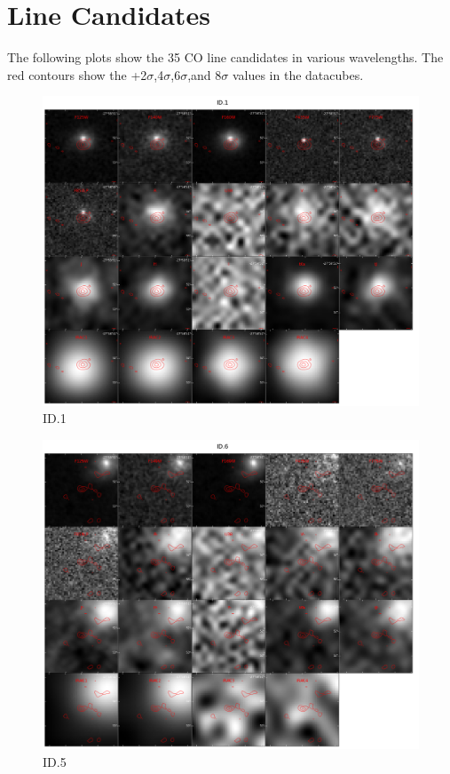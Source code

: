 \section{Line Candidates}\label{sec:A1}

The following plots show the 35 CO line candidates in various wavelengths. The red contours show the  +2$\sigma$,4$\sigma$,6$\sigma$,and 8$\sigma$ values in the datacubes. 

\begin{figure}[tbp]
\centering \includegraphics[width=120mm]{Matched/ASPECS_Cutout_0.jpg}
\caption{ID.1}
\label{fig:Match_One}
\end{figure}

\begin{figure}[tbp]
\centering \includegraphics[width=120mm]{Matched/ASPECS_Cutout_5.jpg}
\caption{ID.5}
\label{fig:Match_Three}
\end{figure}


